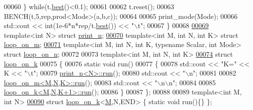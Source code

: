 \begin{DoxyCode}
00060   \} \textcolor{keywordflow}{while}(t.\hyperlink{class_eigen_1_1_bench_timer_ae8b673b0fa356d3432c7a65c79e8af0e}{best}()<0.1);
00061   
00062   t.reset();
00063   BENCH(t,5,rep,prod<Mode>(a,b,c));
00064 
00065   print\_mode(Mode);
00066   std::cout << int(1e-6*n*rep/t.\hyperlink{class_eigen_1_1_bench_timer_ae8b673b0fa356d3432c7a65c79e8af0e}{best}()) << \textcolor{stringliteral}{"\(\backslash\)t"};
00067 \}
00068 
\hyperlink{structprint__n}{00069} \textcolor{keyword}{template}<\textcolor{keywordtype}{int} N> \textcolor{keyword}{struct }\hyperlink{structprint__n}{print\_n};
\hyperlink{structloop__on__m}{00070} \textcolor{keyword}{template}<\textcolor{keywordtype}{int} M, \textcolor{keywordtype}{int} N, \textcolor{keywordtype}{int} K> \textcolor{keyword}{struct }\hyperlink{structloop__on__m}{loop\_on\_m};
\hyperlink{structloop__on__n}{00071} \textcolor{keyword}{template}<\textcolor{keywordtype}{int} M, \textcolor{keywordtype}{int} N, \textcolor{keywordtype}{int} K, \textcolor{keyword}{typename} Scalar, \textcolor{keywordtype}{int} Mode> \textcolor{keyword}{struct }\hyperlink{structloop__on__n}{loop\_on\_n};
00072 
00073 \textcolor{keyword}{template}<\textcolor{keywordtype}{int} M, \textcolor{keywordtype}{int} N, \textcolor{keywordtype}{int} K>
\hyperlink{structloop__on__k}{00074} \textcolor{keyword}{struct }\hyperlink{structloop__on__k}{loop\_on\_k}
00075 \{
00076   \textcolor{keyword}{static} \textcolor{keywordtype}{void} run()
00077   \{
00078     std::cout << \textcolor{stringliteral}{"K="} << K << \textcolor{stringliteral}{"\(\backslash\)t"};
00079     \hyperlink{structprint__n}{print\_n<N>::run}();
00080     std::cout << \textcolor{stringliteral}{"\(\backslash\)n"};
00081 
00082     \hyperlink{structloop__on__m}{loop\_on\_m<M,N,K>::run}();
00083     std::cout << \textcolor{stringliteral}{"\(\backslash\)n\(\backslash\)n"};
00084 
00085     \hyperlink{structloop__on__k}{loop\_on\_k<M,N,K+1>::run}();
00086   \}
00087 \};
00088 
00089 \textcolor{keyword}{template}<\textcolor{keywordtype}{int} M, \textcolor{keywordtype}{int} N>
\hyperlink{structloop__on__k_3_01_m_00_01_n_00_01_e_n_d_01_4}{00090} \textcolor{keyword}{struct }\hyperlink{structloop__on__k}{loop\_on\_k}<\hyperlink{group___core___module_class_eigen_1_1_matrix}{M},N,END> \{ \textcolor{keyword}{static} \textcolor{keywordtype}{void} run()\{\} \};

\end{DoxyCode}
